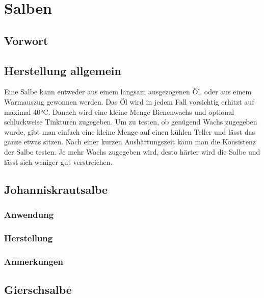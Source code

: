 \chapter{Salben}

\section{Vorwort}


\lipsum[1-2]




\section{Herstellung allgemein}

Eine Salbe kann entweder aus einem langsam ausgezogenen Öl, oder aus einem Warmauszug gewonnen werden. Das Öl wird in jedem Fall vorsichtig erhitzt auf maximal 40°C. Danach wird eine kleine Menge Bienenwachs und optional schluckweise Tinkturen zugegeben. Um zu testen, ob genügend Wachs zugegeben wurde, gibt man einfach eine kleine Menge auf einen kühlen Teller und lässt das ganze etwas sitzen. Nach einer kurzen Aushärtungszeit kann man die Konsistenz der Salbe testen. Je mehr Wachs zugegeben wird, desto härter wird die Salbe und lässt sich weniger gut verstreichen.



\section{Johanniskrautsalbe}


\subsection{Anwendung}
\subsection{Herstellung}
\subsection{Anmerkungen}


\newpage


\section{Gierschsalbe}

